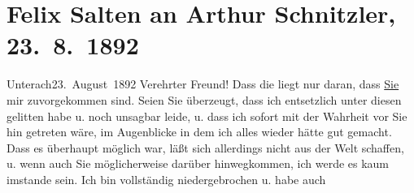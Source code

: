 

         
         \renewcommand{\erwaehntePersonen}{Personen: Richard Beer-Hofmann, Hugo von Hofmannsthal, Felix Salten}
         \renewcommand{\erwaehnteOrte}{Orte: Bahnhof, Unterach am Attersee, Wien}
         \renewcommand{\erwaehnteWerke}{}
               \section[Felix Salten an Arthur Schnitzler, 23. 8. 1892]{ Felix Salten an Arthur Schnitzler, 23. 8. 1892}\nopagebreak{}\rehead{ }\begin{ledgroupsized}[t]{13cm}\normalsize\beginnumbering{} \toendnotes[C]{\smallbreak\pagebreak[2]} 
\toendnotes[C]{\smallbreak}\pstart
           \raggedleft{}{\pb}Unterach23. August 1892\pend
           \pstart
           Verehrter Freund! Dass die \label{K_L03113-1v}\label{K_L03113-1h} liegt nur daran, dass \uline{Sie} mir zuvorgekommen
               sind. Seien Sie überzeugt, dass ich entsetzlich unter diesen \label{K_L03113-2v}\label{K_L03113-2h} gelitten habe u. noch unsagbar leide, u. dass ich sofort mit der Wahrheit vor
               Sie hin getreten wäre, im Augenblicke in dem ich alles wieder hätte gut gemacht. Dass
               es überhaupt möglich war, läßt sich allerdings nicht aus der Welt schaffen, u. wenn
               auch Sie möglicher{\pb}weise darüber hinwegkommen, ich werde
               es kaum imstande sein. Ich bin vollständig niedergebrochen u. habe auch

\end{ledgroupsized}
